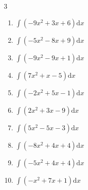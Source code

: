 \begin{multicols}{3}
\begin{enumerate}
\resetques

  \item $\displaystyle \int \left( -9x^{2}+3x+6 \right) \mathrm{d}x$


  \item $\displaystyle \int \left( -5x^{2}-8x+9 \right) \mathrm{d}x$


  \item $\displaystyle \int \left( -9x^{2}-9x+1 \right) \mathrm{d}x$


  \item $\displaystyle \int \left( 7x^{2}+x-5 \right) \mathrm{d}x$


  \item $\displaystyle \int \left( -2x^{2}+5x-1 \right) \mathrm{d}x$


  \item $\displaystyle \int \left( 2x^{2}+3x-9 \right) \mathrm{d}x$


  \item $\displaystyle \int \left( 5x^{2}-5x-3 \right) \mathrm{d}x$


  \item $\displaystyle \int \left( -8x^{2}+4x+4 \right) \mathrm{d}x$


  \item $\displaystyle \int \left( -5x^{2}+4x+4 \right) \mathrm{d}x$


  \item $\displaystyle \int \left( -x^{2}+7x+1 \right) \mathrm{d}x$



\end{enumerate}
\end{multicols}
